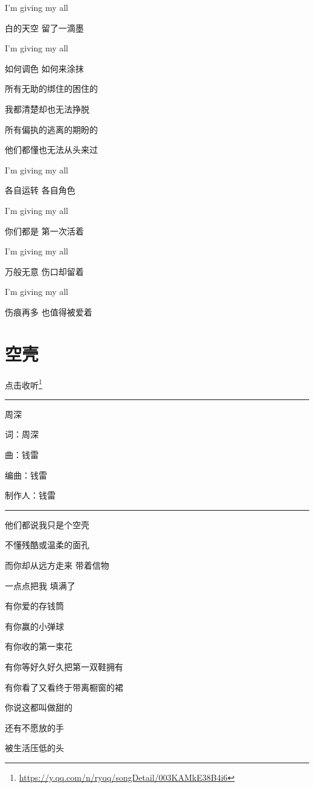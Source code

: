 \documentclass[]{ctexbook}
\renewcommand{\href}[2]{#2\footnote{\url{#1}}}
\begin{document}
I'm giving my all

白的天空 留了一滴墨

I'm giving my all

如何调色 如何来涂抹

所有无助的绑住的困住的

我都清楚却也无法挣脱

所有偏执的逃离的期盼的

他们都懂也无法从头来过

I'm giving my all

各自运转 各自角色

I'm giving my all

你们都是 第一次活着

I'm giving my all

万般无意 伤口却留着

I'm giving my all

伤痕再多 也值得被爱着

\section*{空壳}\label{shen}


\href{https://y.qq.com/n/ryqq/songDetail/003KAMkE38B4i6}{点击收听}

\begin{center}\rule{0.5\linewidth}{0.5pt}\end{center}

周深

词：周深

曲：钱雷

编曲：钱雷

制作人：钱雷

\begin{center}\rule{0.5\linewidth}{0.5pt}\end{center}

他们都说我只是个空壳

不懂残酷或温柔的面孔

而你却从远方走来 带着信物

一点点把我 填满了

有你爱的存钱筒

有你赢的小弹球

有你收的第一束花

有你等好久好久把第一双鞋拥有

有你看了又看终于带离橱窗的裙

你说这都叫做甜的

还有不愿放的手

被生活压低的头
\end{document}
